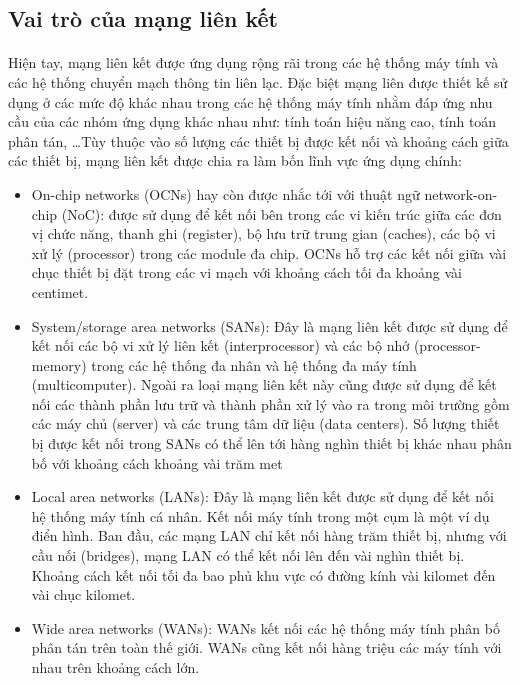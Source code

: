 \documentclass[../report.tex]{subfiles}
\begin{document}
\subsection{Vai trò của mạng liên kết}
\paragraph*{}Hiện tay, mạng liên kết được ứng dụng rộng rãi trong các hệ thống máy tính và các hệ thống chuyển mạch thông tin liên lạc. Đặc biệt mạng liên được thiết kế sử dụng ở các mức độ khác nhau trong các hệ thống máy tính nhằm đáp ứng nhu cầu của các nhóm ứng dụng khác nhau như: tính toán hiệu năng cao, tính toán phân tán, \ldots Tùy thuộc vào số lượng các thiết bị được kết nối và khoảng cách giữa các thiết bị, mạng liên kết được chia ra làm bốn lĩnh vực ứng dụng chính:
\begin{itemize}
    \item On-chip networks (OCNs) hay còn được nhắc tới với thuật ngữ network-on-chip (NoC): được sử dụng để kết nối bên trong các vi kiến trúc giữa các đơn vị chức năng, thanh ghi (register), bộ lưu trữ trung gian (caches), các bộ vi xử lý (processor) trong các module đa chip. OCNs hỗ trợ các kết nối giữa vài chục thiết bị đặt trong các vi mạch với khoảng cách tối đa khoảng vài centimet.
    \item System/storage area networks (SANs): Đây là mạng liên kết được sử dụng để kết nối các bộ vi xử lý liên kết (interprocessor) và các bộ nhớ (processor-memory) trong các hệ thống đa nhân và hệ thống đa máy tính (multicomputer). Ngoài ra loại mạng liên kết này cũng được sử dụng để kết nối các thành phần lưu trữ và thành phần xử lý vào ra trong môi trường gồm các máy chủ (server) và các trung tâm dữ liệu (data centers). Số lượng thiết bị được kết nối trong SANs có thể lên tới hàng nghìn thiết bị khác nhau phân bố với khoảng cách khoảng vài trăm met
    \item Local area networks (LANs): Đây là mạng liên kết được sử dụng để kết nối hệ thống máy tính cá nhân. Kết nối máy tính trong một cụm là một ví dụ điển hình. Ban đầu, các mạng LAN chỉ kết nối hàng trăm thiết bị, nhưng với cầu nối (bridges), mạng LAN có thể kết nối lên đến vài nghìn thiết bị. Khoảng cách kết nối tối đa bao phủ khu vực có đường kính vài kilomet đến vài chục kilomet.
    \item Wide area networks (WANs): WANs kết nối các hệ thống máy tính phân bố phân tán trên toàn thế giới. WANs cũng kết nối hàng triệu các máy tính với nhau trên khoảng cách lớn.
\end{itemize}
\end{document}
